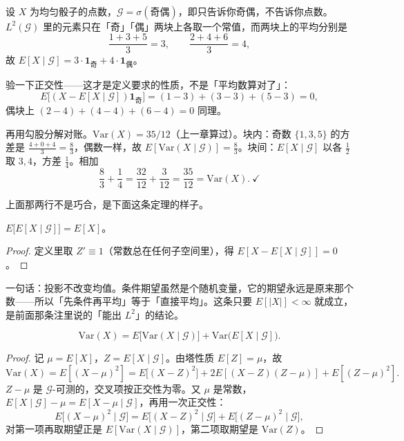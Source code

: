 \begin{example}[骰子的奇偶]\ \\
设 $X$ 为均匀骰子的点数，$\mathcal{G}=\sigma(\text{奇偶})$，即只告诉你奇偶，不告诉你点数。$L^2(\mathcal{G})$ 里的元素只在「奇」「偶」两块上各取一个常值，而两块上的平均分别是
\[
\frac{1+3+5}{3}=3,\qquad \frac{2+4+6}{3}=4,
\]
故 $E[X\mid\mathcal{G}]=3\cdot\mathbf{1}_{\text{奇}}+4\cdot\mathbf{1}_{\text{偶}}$。

验一下正交性——这才是定义要求的性质，不是「平均数算对了」：
\[
E\big[(X-E[X\mid\mathcal{G}])\mathbf{1}_{\text{奇}}\big]=(1-3)+(3-3)+(5-3)=0,
\]
偶块上 $(2-4)+(4-4)+(6-4)=0$ 同理。

再用勾股分解对账。$\mathrm{Var}(X)=35/12$（上一章算过）。块内：奇数 $\{1,3,5\}$ 的方差是 $\frac{4+0+4}{3}=\frac83$，偶数一样，故 $E[\mathrm{Var}(X\mid\mathcal{G})]=\frac83$。块间：$E[X\mid\mathcal{G}]$ 以各 $\frac12$ 取 $3,4$，方差 $\frac14$。相加
\[
\frac83+\frac14=\frac{32}{12}+\frac{3}{12}=\frac{35}{12}=\mathrm{Var}(X).\ \checkmark
\]
\end{example}

上面那两行不是巧合，是下面这条定理的样子。

\begin{proposition}[塔性质]
$E\big[E[X\mid\mathcal{G}]\big]=E[X]$。
\end{proposition}

\begin{proof}
定义里取 $Z'\equiv 1$（常数总在任何子空间里），得 $E[X-E[X\mid\mathcal{G}]]=0$。
\end{proof}

一句话：投影不改变均值。条件期望虽然是个随机变量，它的期望永远是原来那个数——所以「先条件再平均」等于「直接平均」。这条只要 $E[|X|]<\infty$ 就成立，是前面那条注里说的「能出 $L^2$」的结论。

\begin{theorem}[全方差公式]
\[
\mathrm{Var}(X)=E\big[\mathrm{Var}(X\mid\mathcal{G})\big]+\mathrm{Var}\big(E[X\mid\mathcal{G}]\big).
\]
\end{theorem}

\begin{proof}
记 $\mu=E[X]$，$Z=E[X\mid\mathcal{G}]$。由塔性质 $E[Z]=\mu$，故
\[
\mathrm{Var}(X)=E[(X-\mu)^2]=E\big[(X-Z)^2\big]+2E[(X-Z)(Z-\mu)]+E[(Z-\mu)^2].
\]
$Z-\mu$ 是 $\mathcal{G}$-可测的，交叉项按正交性为零。又 $\mu$ 是常数，$E[X\mid\mathcal{G}]-\mu=E[X-\mu\mid\mathcal{G}]$，再用一次正交性：
\[
E\big[(X-\mu)^2\mid\mathcal{G}\big]
=E\big[(X-Z)^2\mid\mathcal{G}\big]+E\big[(Z-\mu)^2\mid\mathcal{G}\big],
\]
对第一项再取期望正是 $E[\mathrm{Var}(X\mid\mathcal{G})]$，第二项取期望是 $\mathrm{Var}(Z)$。
\end{proof}

